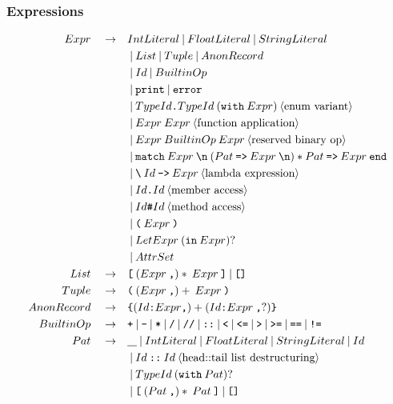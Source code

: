 \documentclass[a4paper, 12pt]{article}
\newcommand{\sepbar}{\: | \:}	%
\newcommand{\substo}{\quad\rightarrow\quad}
\newcommand{\uscore}{\underline{\hspace{0.3cm}}}
\renewcommand{\tt}{\texttt}
\newcommand{\la}{\langle}
\newcommand{\ra}{\rangle}
\begin{document}
\subsubsection{Expressions}
\begin{align*}
Expr \substo& IntLiteral \sepbar FloatLiteral \sepbar StringLiteral\\
&\sepbar List \sepbar Tuple \sepbar AnonRecord\\
&\sepbar Id \sepbar BuiltinOp\\
&\sepbar \tt{print} \sepbar \tt{error}\\
&\sepbar TypeId\tt{.}TypeId \: (\tt{with} \: Expr) \: \la\text{enum variant}\ra \\
&\sepbar Expr \: Expr \: \la\text{function application}\ra \\
&\sepbar Expr \: BuiltinOp \: Expr \: \la\text{reserved binary op}\ra \\
&\sepbar \tt{match}\: Expr\: \tt{\symbol{92}n} \:(Pat \: \tt{=>} \: Expr\:\tt{\symbol{92}n})* Pat \: \tt{=>} \: Expr\:\tt{end}\\
&\sepbar \tt{\symbol{92}}\:Id\: \tt{->}\: Expr\:\la\text{lambda expression}\ra \\
&\sepbar Id\tt{.}Id \: \la\text{member access}\ra\\
&\sepbar Id\tt{\#}Id \: \la\text{method access}\ra\\
&\sepbar \tt{(}\: Expr \: \tt{)}\\
&\sepbar LetExpr \: (\tt{in}\: Expr)?\\
&\sepbar AttrSet\\
List \substo& \tt{[}\: (Expr \: \tt{,})*\: Expr\: \tt{]} \sepbar \tt{[]}\\
Tuple \substo& \tt{(}\: (Expr \: \tt{,})+\: Expr\: \tt{)}\\
AnonRecord \substo& \tt{\{} (Id\tt{:} Expr\tt{,})+ (Id\tt{:} Expr\: \tt{,}?) \tt{\}}\\
BuiltinOp \substo& \tt{+}\sepbar\tt{-}\sepbar\tt{*}\sepbar\tt{/}\sepbar\tt{//}\sepbar\tt{::}\sepbar\tt{<}\sepbar\tt{<=}\sepbar\tt{>}\sepbar\tt{>=}\sepbar\tt{==}\sepbar\tt{!=}\\
Pat \substo& \uscore \sepbar IntLiteral\sepbar FloatLiteral\sepbar StringLiteral\sepbar Id \\
& \sepbar Id\:\tt{::}\: Id\:\la\text{head::tail list destructuring}\ra\\
& \sepbar TypeId \: (\tt{with}\: Pat)?\\
& \sepbar \tt{[} \: ( Pat\:\tt{,})*\: Pat \: \tt{]} \sepbar  \tt{[]}\\

\end{align*}
\end{document}
